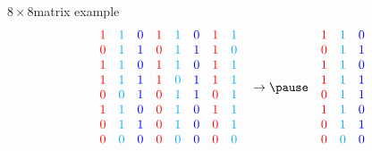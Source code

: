 \documentclass{beamer}
\begin{document}
\begin{frame}
  \begin{block}{$8 \times 8$matrix example}
    \[
      \begin{matrix}
        \color{red} 1 & \color{cyan} 1 & \color{blue} 0 & \color{red} 1 & \color{cyan} 1 & \color{blue} 0 & \color{red} 1 & \color{cyan} 1 \\
        \color{red} 0 & \color{cyan} 1 & \color{blue} 1 & \color{red} 0 & \color{cyan} 1 & \color{blue} 1 & \color{red} 1 & \color{cyan} 0 \\
        \color{red} 1 & \color{cyan} 1 & \color{blue} 0 & \color{red} 1 & \color{cyan} 1 & \color{blue} 0 & \color{red} 1 & \color{cyan} 1 \\
        \color{red} 1 & \color{cyan} 1 & \color{blue} 1 & \color{red} 1 & \color{cyan} 0 & \color{blue} 1 & \color{red} 1 & \color{cyan} 1 \\
        \color{red} 0 & \color{cyan} 0 & \color{blue} 1 & \color{red} 0 & \color{cyan} 1 & \color{blue} 1 & \color{red} 0 & \color{cyan} 1 \\
        \color{red} 1 & \color{cyan} 1 & \color{blue} 0 & \color{red} 0 & \color{cyan} 1 & \color{blue} 0 & \color{red} 1 & \color{cyan} 1 \\
        \color{red} 0 & \color{cyan} 1 & \color{blue} 1 & \color{red} 0 & \color{cyan} 1 & \color{blue} 0 & \color{red} 0 & \color{cyan} 1 \\
        \color{red} 0 & \color{cyan} 0 & \color{blue} 0 & \color{red} 0 & \color{cyan} 0 & \color{blue} 0 & \color{red} 0 & \color{cyan} 0
      \end{matrix} \quad \rightarrow \pause \quad \begin{matrix}
        \color{red} 1 & \color{cyan} 1 & \color{blue} 0 \\
        \color{red} 0 & \color{cyan} 1 & \color{blue} 1 \\
        \color{red} 1 & \color{cyan} 1 & \color{blue} 0 \\
        \color{red} 1 & \color{cyan} 1 & \color{blue} 1 \\
        \color{red} 0 & \color{cyan} 1 & \color{blue} 1 \\
        \color{red} 1 & \color{cyan} 1 & \color{blue} 0 \\
        \color{red} 0 & \color{cyan} 1 & \color{blue} 1 \\
        \color{red} 0 & \color{cyan} 0 & \color{blue} 0
      \end{matrix}
    \]
  \end{block}
\end{frame}
\end{document}
